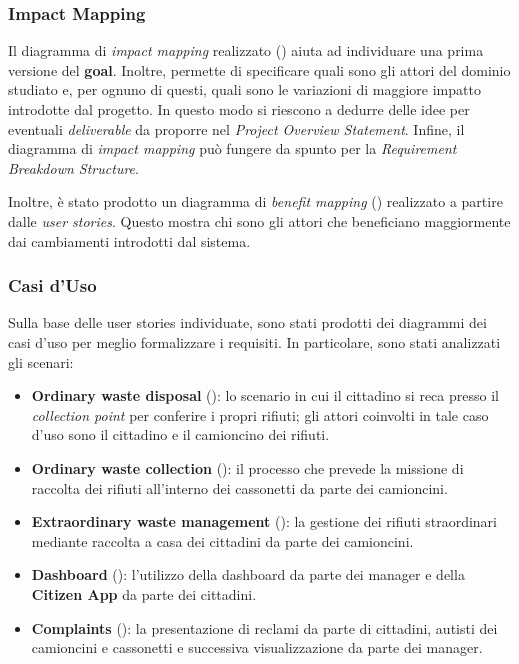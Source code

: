 \subsubsection{Impact Mapping}
Il diagramma di \textit{impact mapping} realizzato () aiuta ad individuare una prima versione del \textbf{goal}. Inoltre, permette di specificare quali sono gli attori del dominio studiato e, per ognuno di questi, quali sono le variazioni di maggiore impatto introdotte dal progetto. In questo modo si riescono a dedurre delle idee per eventuali \textit{deliverable} da proporre nel \textit{Project Overview Statement}. Infine, il diagramma di \textit{impact mapping} può fungere da spunto per la \textit{Requirement Breakdown Structure}.

Inoltre, è stato prodotto un diagramma di \textit{benefit mapping} () realizzato a partire dalle \textit{user stories}. Questo mostra chi sono gli attori che beneficiano maggiormente dai cambiamenti introdotti dal sistema.

\subsubsection{Casi d'Uso}
Sulla base delle user stories individuate, sono stati prodotti dei diagrammi dei casi d'uso per meglio formalizzare i requisiti. In particolare, sono stati analizzati gli scenari:
\begin{itemize}
    \item \textbf{Ordinary waste disposal} (): lo scenario in cui il cittadino si reca presso il \textit{collection point} per conferire i propri rifiuti; gli attori coinvolti in tale caso d'uso sono il cittadino e il camioncino dei rifiuti.
    \item \textbf{Ordinary waste collection} (): il processo che prevede la missione di raccolta dei rifiuti all'interno dei cassonetti da parte dei camioncini.
    \item \textbf{Extraordinary waste management} (): la gestione dei rifiuti straordinari mediante raccolta a casa dei cittadini da parte dei camioncini.
    \item \textbf{Dashboard} (): l'utilizzo della dashboard da parte dei manager e della \textbf{Citizen App} da parte dei cittadini.
    \item \textbf{Complaints} (): la presentazione di reclami da parte di cittadini, autisti dei camioncini e cassonetti e successiva visualizzazione da parte dei manager.
\end{itemize}

